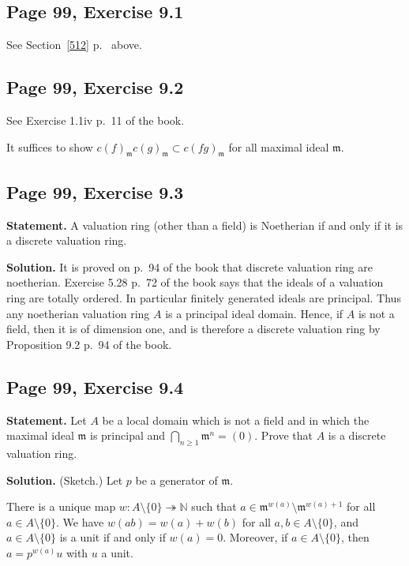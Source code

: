 \documentclass[parskip=half,fontsize=12pt]{scrartcl}%
\newcommand{\mf}{\mathfrak}
\newcommand{\mmm}{\mf m}
\newcommand{\epi}{\twoheadrightarrow}
\begin{document}
\subsection{Page 99, Exercise 9.1}%

See Section~\ref{512} p.~\pageref{512} above.

\subsection{Page 99, Exercise 9.2}%

See Exercise 1.1iv p.~11 of the book. 

It suffices to show $c(f)_\mmm c(g)_\mmm\subset c(fg)_\mmm$ for all maximal ideal $\mmm$. 

\subsection{Page 99, Exercise 9.3}%

\textbf{Statement.} A valuation ring (other than a field) is Noetherian if and only if it is a discrete valuation ring.

\textbf{Solution.} It is proved on p.~94 of the book that discrete valuation ring are noetherian. Exercise 5.28 p.~72 of the book says that the ideals of a valuation ring are totally ordered. In particular finitely generated ideals are principal. Thus any noetherian valuation ring $A$ is a principal ideal domain. Hence, if $A$ is not a field, then it is of dimension one, and is therefore a discrete valuation ring by Proposition 9.2 p.~94 of the book.

\subsection{Page 99, Exercise 9.4}%

\textbf{Statement.} Let $A$ be a local domain which is not a field and in which the maximal ideal $\mmm$ is principal and $\bigcap_{n\ge1}\mmm^n=(0)$. Prove that $A$ is a discrete valuation ring.

\textbf{Solution.} (Sketch.) Let $p$ be a generator of $\mmm$. 

There is a unique map $w:A\setminus\{0\}\epi\mathbb N$ such that $a\in\mmm^{w(a)}\setminus\mmm^{w(a)+1}$ for all $a\in A\setminus\{0\}$. We have $w(ab)=w(a)+w(b)$ for all $a,b\in A\setminus\{0\}$, and $a\in A\setminus\{0\}$ is a unit if and only if $w(a)=0$. Moreover, if $a\in A\setminus\{0\}$, then $a=p^{w(a)}u$ with  $u$ a unit.
\end{document}
